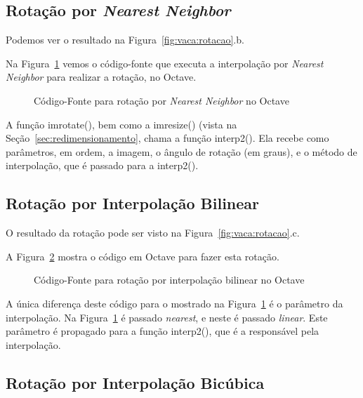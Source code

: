 \documentclass[12pt]{article}
\begin{document}
\subsection{Rotação por \textit{Nearest Neighbor}}\label{sec:rotacao:nearest}

Podemos ver o resultado na Figura~\ref{fig:vaca:rotacao}.b.

Na Figura~\ref{lst:rotate:nearest} vemos o código-fonte que executa a interpolação por \textit{Nearest Neighbor} para realizar a rotação, no Octave.

\begin{figure}[H]

\caption{Código-Fonte para rotação por \textit{Nearest Neighbor} no Octave}
\label{lst:rotate:nearest}
\end{figure}

A função \textsf{imrotate()}, bem como a \textsf{imresize()} (vista na Seção~\ref{sec:redimensionamento}, chama a função \textsf{interp2()}. Ela recebe como parâmetros, em ordem, a imagem, o ângulo de rotação (em graus), e o método de interpolação, que é passado para a \textsf{interp2()}.~\cite{eaton:2008}

\subsection{Rotação por Interpolação Bilinear}\label{sec:rotacao:bilinear}

O resultado da rotação pode ser visto na Figura~\ref{fig:vaca:rotacao}.c.

A Figura~\ref{lst:rotate:bilinear} mostra o código em Octave para fazer esta rotação.

\begin{figure}[H]

\caption{Código-Fonte para rotação por interpolação bilinear no Octave}
\label{lst:rotate:bilinear}
\end{figure}

A única diferença deste código para o mostrado na Figura~\ref{lst:rotate:nearest} é o parâmetro da interpolação. Na Figura~\ref{lst:rotate:nearest} é passado \emph{nearest}, e neste é passado \emph{linear}. Este parâmetro é propagado para a função \textsf{interp2()}, que é a responsável pela interpolação.

\subsection{Rotação por Interpolação Bicúbica}\label{sec:rotacao:bicubica}
\end{document}
